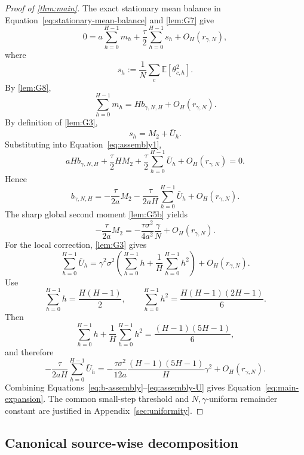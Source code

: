 \documentclass[11pt]{article}
\theoremstyle{definition}
\newcommand{\E}{\mathbb{E}}
\newcommand{\remscale}{r_{\gamma,N}}
\newcommand{\bstat}{b_{\gamma,N,H}}
\newcommand{\Ubar}{\bar U}
\begin{document}
\begin{proof}[Proof of \cref{thm:main}]
The exact stationary mean balance in Equation~\eqref{eq:stationary-mean-balance} and \cref{lem:G7} give
\begin{equation}
\label{eq:assembly1}
  0
  =a\sum_{h=0}^{H-1}m_h
   +\frac\tau2\sum_{h=0}^{H-1}s_h
   +O_H(\remscale),
\end{equation}
where
\[
  s_h:=\frac1N\sum_c\E[\theta_{c,h}^2].
\]
By \cref{lem:G8},
\[
  \sum_{h=0}^{H-1}m_h=H\bstat+O_H(\remscale).
\]
By definition of \cref{lem:G3},
\[
  s_h=M_2+\Ubar_h.
\]
Substituting into Equation~\eqref{eq:assembly1},
\[
  aH\bstat+\frac\tau2HM_2
  +\frac\tau2\sum_{h=0}^{H-1}\Ubar_h
  +O_H(\remscale)=0.
\]
Hence
\begin{equation}
\label{eq:b-assembly}
  \bstat
  =-\frac\tau{2a}M_2
   -\frac\tau{2aH}\sum_{h=0}^{H-1}\Ubar_h
   +O_H(\remscale).
\end{equation}
The sharp global second moment \cref{lem:G5b} yields
\begin{equation}
\label{eq:assembly-M2}
  -\frac\tau{2a}M_2
  =-\frac{\tau\sigma^2}{4a^2}\frac{\gamma}{N}
   +O_H(\remscale).
\end{equation}
For the local correction, \cref{lem:G3} gives
\[
  \sum_{h=0}^{H-1}\Ubar_h
  =\gamma^2\sigma^2\left(
    \sum_{h=0}^{H-1}h+
    \frac1H\sum_{h=0}^{H-1}h^2
  \right)+O_H(\remscale).
\]
Use
\[
  \sum_{h=0}^{H-1}h=\frac{H(H-1)}2,
  \qquad
  \sum_{h=0}^{H-1}h^2=\frac{H(H-1)(2H-1)}6.
\]
Then
\[
  \sum_{h=0}^{H-1}h+\frac1H\sum_{h=0}^{H-1}h^2
  =\frac{(H-1)(5H-1)}6,
\]
and therefore
\begin{equation}
\label{eq:assembly-U}
  -\frac\tau{2aH}\sum_{h=0}^{H-1}\Ubar_h
  =-\frac{\tau\sigma^2}{12a}
  \frac{(H-1)(5H-1)}{H}\gamma^2
  +O_H(\remscale).
\end{equation}
Combining Equations~\eqref{eq:b-assembly}--\eqref{eq:assembly-U} gives Equation~\eqref{eq:main-expansion}. The common small-step threshold and $N,\gamma$-uniform remainder constant are justified in Appendix~\ref{sec:uniformity}.
\end{proof}

\subsection{Canonical source-wise decomposition}
\end{document}
